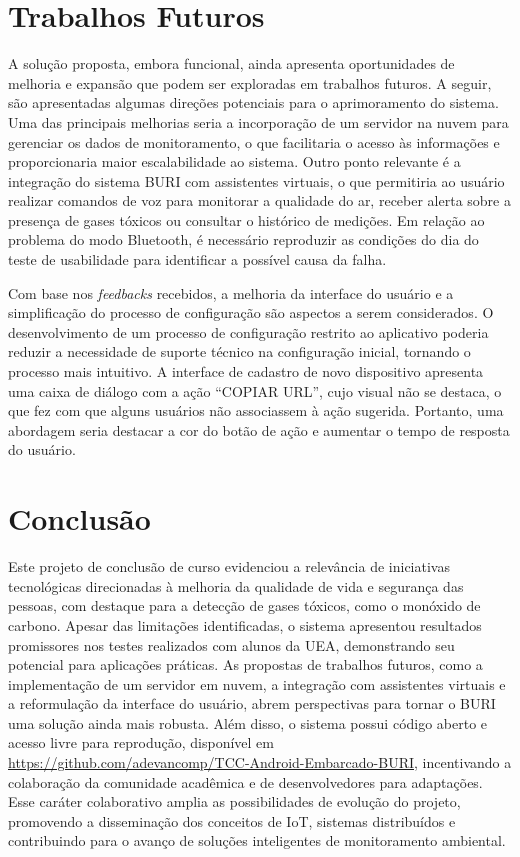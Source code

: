 \section{Trabalhos Futuros}\label{cap5:trabalhos-futuros}

A solução proposta, embora funcional, ainda apresenta oportunidades de melhoria e expansão que podem ser exploradas em trabalhos futuros. A seguir, são apresentadas algumas direções potenciais para o aprimoramento do sistema. Uma das 
principais melhorias seria a incorporação de um servidor na nuvem para gerenciar os dados de monitoramento, o que facilitaria o acesso às informações e proporcionaria maior escalabilidade ao sistema. Outro ponto relevante é a integração do sistema 
BURI com assistentes virtuais, o que permitiria ao usuário realizar comandos de voz para monitorar a qualidade do ar, receber alerta sobre a presença de gases tóxicos ou consultar o histórico de medições. Em relação ao problema do modo 
Bluetooth, é necessário reproduzir as condições do dia do teste de usabilidade para identificar a possível causa da falha.

Com base nos \textit{feedbacks} recebidos, a melhoria da interface do usuário e a simplificação do processo de configuração são aspectos a serem considerados. O desenvolvimento de um processo de configuração restrito ao aplicativo poderia reduzir a 
necessidade de suporte técnico na configuração inicial, tornando o processo mais intuitivo. A interface de cadastro de novo dispositivo apresenta uma caixa de diálogo com a ação ``COPIAR URL'', cujo visual não se destaca, o que fez com que alguns 
usuários não associassem à ação sugerida. Portanto, uma abordagem seria destacar a cor do botão de ação e aumentar o tempo 
de resposta do usuário.

\section{Conclusão}\label{cap5:conclusao}

Este projeto de conclusão de curso evidenciou a relevância de iniciativas tecnológicas direcionadas à melhoria da qualidade de vida e segurança das pessoas, com destaque para 
a detecção de gases tóxicos, como o monóxido de carbono. Apesar das limitações identificadas, o sistema apresentou resultados promissores nos testes realizados com 
alunos da UEA, demonstrando seu potencial para aplicações práticas. As propostas de trabalhos futuros, como a implementação de um servidor em nuvem, a integração com assistentes 
virtuais e a reformulação da interface do usuário, abrem perspectivas para tornar o BURI uma solução ainda mais robusta. Além disso, o sistema possui código aberto e acesso livre 
para reprodução, disponível em \url{https://github.com/adevancomp/TCC-Android-Embarcado-BURI}, incentivando a colaboração da comunidade acadêmica e de desenvolvedores para adaptações. Esse caráter colaborativo amplia as possibilidades de evolução do projeto, 
promovendo a disseminação dos conceitos de IoT, sistemas distribuídos e contribuindo para o avanço de soluções inteligentes de monitoramento ambiental.
